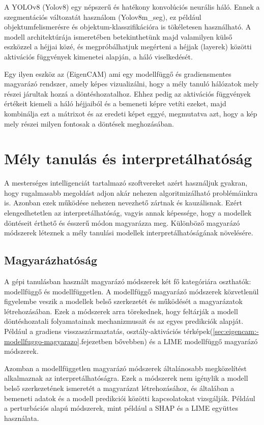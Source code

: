 \documentclass[12pt,oneside,a4paper]{article}
\newcommand{\newsection}[1]{\clearpage\section{#1}}\label{makro}
\theoremstyle{remark}
\begin{document}
    A YOLOv8 (\gls{Yolov8}) egy népszerű és hatékony konvolúciós neurális háló.
    Ennek a szegmentációs változatát használom (Yolov8m\_seg), ez
    például objektumfelismerésre és objektum-klasszifikációra is tökéletesen használható.
    A modell architektúrája ismeretében betekinthetünk majd valamilyen külső eszközzel a héjjai közé,
    és megpróbálhatjuk megérteni a héjjak (layerek) közötti aktivációs függvények kimenetei alapján, a háló viselkedését.

    Egy ilyen eszköz az  (\gls{EigenCAM}) ami egy modellfüggő és gradiensmentes magyarázó rendszer,
    amely képes vizualizálni, hogy a mély tanuló hálózatok mely részei járultak hozzá a döntéshozatalhoz.
    Ehhez pedig
    az aktivációs függvények értékeit kiemeli a háló héjjaiból és a bemeneti képre vetíti ezeket, majd kombinálja
    ezt a mátrixot és az eredeti képet eggyé, megmutatva azt, hogy a kép mely részei milyen fontosak a döntések meghozásában.

\newsection{Mély tanulás és interpretálhatóság}\label{sec:mely-tanulas-es-interpretalhatosag}
A mesterséges intelligenciát tartalmazó szoftvereket azért használjuk gyakran, hogy rugalmasabb megoldást adjon akár
nehezen algoritmizálható problémáinkra is.
Azonban ezek működése nehezen nevezhető zártnak és kauzálisnak.
 Ezért elengedhetetlen az interpretálhatóság, vagyis annak képessége, hogy a modellek
döntéseit érthető és ésszerű módon magyarázza meg.
    Különböző magyarázó módszerek léteznek a mély tanulási modellek interpretálhatóságának növelésére.

\subsection{Magyarázhatóság}\label{subsec:magyarazhatosag}
A gépi tanulásban használt magyarázó módszerek két fő kategóriára oszthatók: modellfüggő és modellfüggetlen.
A modellfüggő magyarázó módszerek közvetlenül figyelembe veszik a modellek belső szerkezetét és működését a magyarázatok
létrehozásában.
Ezek a módszerek arra törekednek, hogy feltárják a modell döntéshozatali folyamatainak mechanizmusait és az
egyes predikciók alapját.
Például a gradiens visszaszármaztatás, osztály-aktivációs térképek(\ref{sec:eigencam:-modellfuggo-magyarazo}.fejezetben bővebben)\label{sechiv}
és a LIME modellfüggő magyarázó módszerek.

Azomban a modellfüggetlen magyarázó módszerek általánosabb megközelítést alkalmaznak az interpretálhatóságra.
Ezek a módszerek nem igénylik a modell belső szerkezetének ismeretét a magyarázat létrehozásához, és általában
a bemeneti adatok és a modell predikciói közötti kapcsolatokat vizsgálják.
Például a perturbációs alapú módszerek, mint például a SHAP és a LIME együttes használata.
\end{document}
